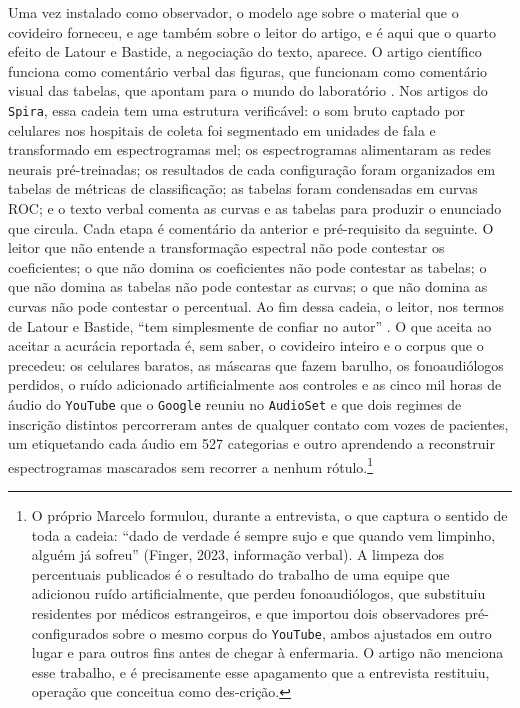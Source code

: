 Uma vez instalado como observador, o modelo age sobre o material que o covideiro forneceu, e age também sobre o leitor do artigo, e é aqui que o quarto efeito de Latour e Bastide, a negociação do texto, aparece. O artigo científico funciona como comentário verbal das figuras, que funcionam como comentário visual das tabelas, que apontam para o mundo do laboratório \parencite[pp.~58--59]{Latour1986Writing}. Nos artigos do \texttt{Spira}, essa cadeia tem uma estrutura verificável: o som bruto captado por celulares nos hospitais de coleta foi segmentado em unidades de fala e transformado em espectrogramas mel; os espectrogramas alimentaram as redes neurais pré-treinadas; os resultados de cada configuração foram organizados em tabelas de métricas de classificação; as tabelas foram condensadas em curvas ROC; e o texto verbal comenta as curvas e as tabelas para produzir o enunciado que circula. Cada etapa é comentário da anterior e pré-requisito da seguinte. O leitor que não entende a transformação espectral não pode contestar os coeficientes; o que não domina os coeficientes não pode contestar as tabelas; o que não domina as tabelas não pode contestar as curvas; o que não domina as curvas não pode contestar o percentual. Ao fim dessa cadeia, o leitor, nos termos de Latour e Bastide, \enquote{tem simplesmente de confiar no autor} \parencite[p.~58]{Latour1986Writing}. O que aceita ao aceitar a acurácia reportada é, sem saber, o covideiro inteiro e o corpus que o precedeu: os celulares baratos, as máscaras que fazem barulho, os fonoaudiólogos perdidos, o ruído adicionado artificialmente aos controles e as cinco mil horas de áudio do \texttt{YouTube} que o \texttt{Google} reuniu no \texttt{AudioSet} e que dois regimes de inscrição distintos percorreram antes de qualquer contato com vozes de pacientes, um etiquetando cada áudio em 527 categorias e outro aprendendo a reconstruir espectrogramas mascarados sem recorrer a nenhum rótulo.\footnote{O próprio Marcelo formulou, durante a entrevista, o que captura o sentido de toda a cadeia: \enquote{dado de verdade é sempre sujo e que quando vem limpinho, alguém já sofreu} (Finger, 2023, informação verbal). A limpeza dos percentuais publicados é o resultado do trabalho de uma equipe que adicionou ruído artificialmente, que perdeu fonoaudiólogos, que substituiu residentes por médicos estrangeiros, e que importou dois observadores pré-configurados sobre o mesmo corpus do \texttt{YouTube}, ambos ajustados em outro lugar e para outros fins antes de chegar à enfermaria. O artigo não menciona esse trabalho, e é precisamente esse apagamento que a entrevista restituiu, operação que \textcite{Akrich1992Description} conceitua como des-crição.}

